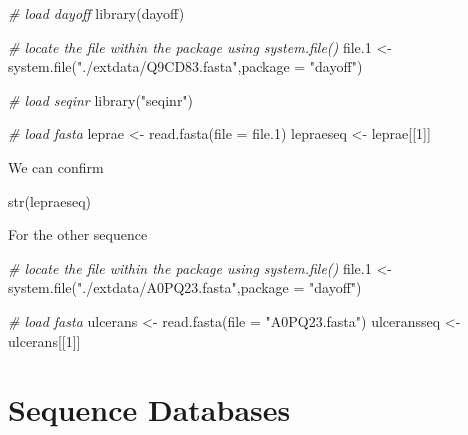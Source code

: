 \documentclass[
]{book}
\newenvironment{Shaded}{\begin{snugshade}}{\end{snugshade}}
\newcommand{\AttributeTok}[1]{\textcolor[rgb]{0.77,0.63,0.00}{#1}}
\newcommand{\CommentTok}[1]{\textcolor[rgb]{0.56,0.35,0.01}{\textit{#1}}}
\newcommand{\DecValTok}[1]{\textcolor[rgb]{0.00,0.00,0.81}{#1}}
\newcommand{\FloatTok}[1]{\textcolor[rgb]{0.00,0.00,0.81}{#1}}
\newcommand{\FunctionTok}[1]{\textcolor[rgb]{0.00,0.00,0.00}{#1}}
\newcommand{\NormalTok}[1]{#1}
\newcommand{\OtherTok}[1]{\textcolor[rgb]{0.56,0.35,0.01}{#1}}
\newcommand{\StringTok}[1]{\textcolor[rgb]{0.31,0.60,0.02}{#1}}
\begin{document}
\begin{Shaded}
\begin{Highlighting}[]
\CommentTok{\# load dayoff}
\FunctionTok{library}\NormalTok{(dayoff)}

\CommentTok{\# locate the file within the package using system.file()}
\NormalTok{file}\FloatTok{.1} \OtherTok{\textless{}{-}} \FunctionTok{system.file}\NormalTok{(}\StringTok{"./extdata/Q9CD83.fasta"}\NormalTok{,}\AttributeTok{package =} \StringTok{"dayoff"}\NormalTok{)}

\CommentTok{\# load seqinr}
\FunctionTok{library}\NormalTok{(}\StringTok{"seqinr"}\NormalTok{)}

\CommentTok{\# load fasta}
\NormalTok{leprae }\OtherTok{\textless{}{-}} \FunctionTok{read.fasta}\NormalTok{(}\AttributeTok{file =}\NormalTok{ file}\FloatTok{.1}\NormalTok{)}
\NormalTok{lepraeseq }\OtherTok{\textless{}{-}}\NormalTok{ leprae[[}\DecValTok{1}\NormalTok{]]}
\end{Highlighting}
\end{Shaded}

We can confirm

\begin{Shaded}
\begin{Highlighting}[]
\FunctionTok{str}\NormalTok{(lepraeseq)}
\end{Highlighting}
\end{Shaded}

For the other sequence

\begin{Shaded}
\begin{Highlighting}[]
\CommentTok{\# locate the file within the package using system.file()}
\NormalTok{file}\FloatTok{.1} \OtherTok{\textless{}{-}} \FunctionTok{system.file}\NormalTok{(}\StringTok{"./extdata/A0PQ23.fasta"}\NormalTok{,}\AttributeTok{package =} \StringTok{"dayoff"}\NormalTok{)}


\CommentTok{\# load fasta}
\NormalTok{ulcerans }\OtherTok{\textless{}{-}} \FunctionTok{read.fasta}\NormalTok{(}\AttributeTok{file =} \StringTok{"A0PQ23.fasta"}\NormalTok{)}
\NormalTok{ulceransseq }\OtherTok{\textless{}{-}}\NormalTok{ ulcerans[[}\DecValTok{1}\NormalTok{]]}
\end{Highlighting}
\end{Shaded}

\hypertarget{sequence-databases}{%
\chapter{Sequence Databases}\label{sequence-databases}}
\end{document}
